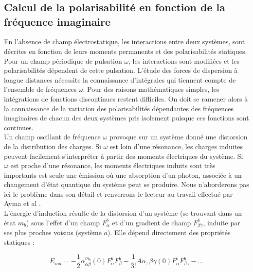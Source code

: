 \chapter[]{}
\minitoc
\restoregeometry

\newpage
	
\section*{Calcul de la polarisabilité en fonction de la fréquence imaginaire}
	
En l'absence de champ électrostatique, les interactions entre deux systèmes, sont décrites en fonction de leurs moments permanents et des polarisabilités statiques. Pour un champ périodique de pulsation $\omega$, les interactions sont modifiées et les polarisabilités dépendent de cette pulsation. L'étude des forces de dispersion à longue distances nécessite la connaissance d'intégrales qui tiennent compte de l'ensemble de fréquences $\omega$. Pour des raisons mathématiques simples, les intégrations de fonctions discontinues restent difficiles. On doit se ramener alors à la connaissance de la variation des polarisabilités dépendantes des fréquences imaginaires de chacun des deux systèmes pris isolement puisque ces fonctions sont continues.\\
	
Un champ oscillant de fréquence $\omega$ provoque sur un système donné une distorsion de la distribution des charges. Si $\omega$ est loin d'une résonance, les charges induites peuvent facilement s'interpréter à partir des moments électriques du système. Si $\omega$ est proche d'une résonance, les moments électriques induits sont très importants est seule une émission où une absorption d'un photon, associée à un changement d'état quantique du système peut se produire. Nous n'aborderons pas ici le problème dans son détail et renverrons le lecteur au travail effectué par Ayma et al \cite{ayma1997etude}.\\
	
	
L'énergie d'induction résulte de la distorsion d'un système (se trouvant dans un état $m_{b}$) sous l'effet d'un champ $F_{\alpha}^{b}$ et d'un gradient de champ $F_{\beta\gamma}^{b}$, induite par ses plus proches voisins (système $a$). Elle dépend directement des propriétés statiques : 
	
\begin{equation}
E_{ind} = -\frac{1}{2} \alpha_{\alpha\beta}^{m_{b}} (0) F_{\alpha}^{b} F_{\beta}^{b} - \frac{1}{3!} A\alpha , \beta\gamma (0) F_{\alpha}^{b} F_{\beta\gamma}^{b} - \ldots
\end{equation}
	
